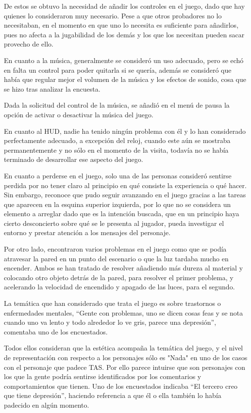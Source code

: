\documentclass[12pt, a4paper,twoside,titlepage]{book}
\begin{document}
De estos se obtuvo la necesidad de añadir los controles en el juego, dado que hay quienes lo consideraron muy necesario. Pese a que otros probadores no lo necesitaban, en el momento en que uno lo necesita es suficiente para añadirlos, pues no afecta a la jugabilidad de los demás y los que los necesitan pueden sacar provecho de ello. 

En cuanto a la música, generalmente se consideró un uso adecuado, pero se echó en falta un control para poder quitarla si se quería, además se consideró que había que regular mejor el volumen de la música y los efectos de sonido, cosa que se hizo tras analizar la encuesta. 

Dada la solicitud del control de la música, se añadió en el menú de pausa la opción de activar o desactivar la música del juego. 

En cuanto al HUD, nadie ha tenido ningún problema con él y lo han considerado perfectamente adecuado, a excepción del reloj, cuando este aún se mostraba permanentemente y no sólo en el momento de la visita, todavía no se había terminado de desarrollar ese aspecto del juego. 

En cuanto a perderse en el juego, solo una de las personas consideró sentirse perdida por no tener claro al principio en qué consiste la experiencia o qué hacer. Sin embargo, reconoce que pudo seguir avanzando en el juego gracias a las tareas que aparecen en la esquina superior izquierda, por lo que no se considera un elemento a arreglar dado que es la intención buscada, que en un principio haya cierto desconcierto sobre qué se le presenta al jugador, pueda investigar el entorno y prestar atención a los mensajes del personaje.

Por otro lado, encontraron varios problemas en el juego como que se podía atravesar la pared en un punto del escenario o que la luz tardaba mucho en encender. Ambos se han tratado de resolver añadiendo más dureza al material y colocando otro objeto detrás de la pared, para resolver el primer problema, y acelerando la velocidad de encendido y apagado de las luces, para el segundo. 

La temática que han considerado que trata el juego es sobre trastornos o enfermedades mentales, ``Gente con problemas, uno se dicen cosas feas y se nota cuando uno va lento y todo alrededor lo ve gris, parece una depresión'', comentaba uno de los encuestados. 

Todos ellos consideran que la estética acompaña la temática del juego, y el nivel de representación con respecto a los personajes sólo es "Nada" en uno de los casos con el personaje que padece TAS. Por ello parece intuirse que son personajes con los que la gente podría sentirse identificados por los comentarios y comportamientos que tienen. Uno de los encuestados indicaba ``El tercero creo que tiene depresión'', haciendo referencia a que él o ella también lo había padecido en algún momento. 
\end{document}
